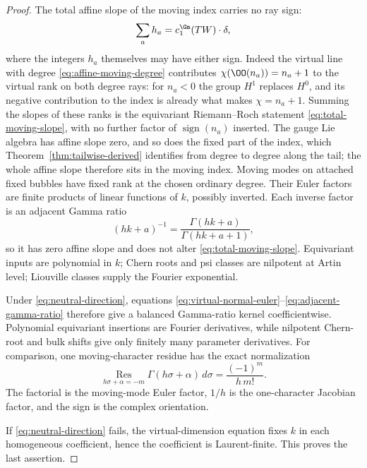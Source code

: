 \begin{proof}
The total affine slope of the moving index carries no ray sign:
\begin{equation}\label{eq:total-moving-slope}
 \sum_a h_a=c_1^{\Gm}(TW)\cdot\delta,
\end{equation}
where the integers \(h_a\) themselves may have either sign.  Indeed the
virtual line with degree \eqref{eq:affine-moving-degree} contributes
\(\chi(\OO(n_a))=n_a+1\) to the virtual rank on both degree rays: for
\(n_a<0\) the group \(H^1\) replaces \(H^0\), and its negative contribution to
the index is already what makes \(\chi=n_a+1\).  Summing the slopes of these
ranks is the equivariant Riemann--Roch statement
\eqref{eq:total-moving-slope}, with no further factor of
\(\operatorname{sign}(n_a)\) inserted.
The gauge Lie algebra has affine slope zero, and so does the fixed part of the
index, which Theorem~\ref{thm:tailwise-derived} identifies from degree to
degree along the tail; the whole affine slope therefore sits in the moving
index.  Moving modes on attached fixed
bubbles have fixed rank at the chosen ordinary degree.  Their Euler factors are
finite products of linear functions of \(k\), possibly inverted.  Each
inverse factor is an adjacent Gamma ratio
\begin{equation}\label{eq:adjacent-gamma-ratio}
 (hk+a)^{-1}=\frac{\Gamma(hk+a)}{\Gamma(hk+a+1)},
\end{equation}
so it has zero affine slope and does not alter
\eqref{eq:total-moving-slope}.  Equivariant inputs
are polynomial in \(k\); Chern roots and psi classes are nilpotent at Artin
level; Liouville classes supply the Fourier exponential.

Under \eqref{eq:neutral-direction}, equations
\eqref{eq:virtual-normal-euler}--\eqref{eq:adjacent-gamma-ratio} therefore
give a balanced Gamma-ratio kernel coefficientwise.  Polynomial equivariant
insertions are Fourier
derivatives, while nilpotent Chern-root and bulk shifts give only finitely
many parameter derivatives.  For comparison, one moving-character residue
has the exact normalization
\begin{equation}\label{eq:simple-gamma-residue}
 \operatorname*{Res}_{h\sigma+\alpha=-m}
 \Gamma(h\sigma+\alpha)\,d\sigma
 =\frac{(-1)^m}{h\,m!}.
\end{equation}
The factorial is the moving-mode Euler factor, \(1/h\) is the
one-character Jacobian factor, and the sign is the complex orientation.

If \eqref{eq:neutral-direction} fails, the virtual-dimension equation fixes
\(k\) in each homogeneous
coefficient, hence the coefficient is Laurent-finite.  This proves the last
assertion.
\end{proof}

